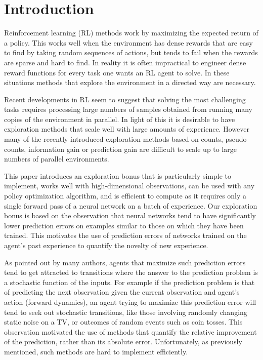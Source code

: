 \documentclass{article} %
\begin{document}
\section{Introduction}
Reinforcement learning (RL) methods work by maximizing the expected return of a policy. This works well when the environment has dense rewards that are easy to find by taking random sequences of actions, but tends to fail when the rewards are sparse and hard to find. In reality it is often impractical to engineer dense reward functions for every task one wants an RL agent to solve. In these situations methods that explore the environment in a directed way are necessary.

Recent developments in RL seem to suggest that solving the most challenging tasks \citep{SilverHuangEtAl16nature,zoph2016neural,horgan2018distributed,espeholt2018impala,openai2018dota,openai2018dexterous} requires processing large numbers of samples obtained from running many copies of the environment in parallel. In light of this it is desirable to have exploration methods that scale well with large amounts of experience. However many of the recently introduced exploration methods based on counts, pseudo-counts, information gain or prediction gain are difficult to scale up to large numbers of parallel environments.

This paper introduces an exploration bonus that is particularly simple to implement, works well with high-dimensional observations, can be used with any policy optimization algorithm, and is efficient to compute as it requires only a single forward pass of a neural network on a batch of experience. Our exploration bonus is based on the observation that neural networks tend to have significantly lower prediction errors on examples similar to those on which they have been trained. This motivates the use of prediction errors of networks trained on the agent's past experience to quantify the novelty of new experience.

As pointed out by many authors, agents that maximize such prediction errors tend to get attracted to transitions where the answer to the prediction problem is a stochastic function of the inputs. For example if the prediction problem is that of predicting the next observation given the current observation and agent's action (forward dynamics), an agent trying to maximize this prediction error will tend to seek out stochastic transitions, like those involving randomly changing static noise on a TV, or outcomes of random events such as coin tosses. This observation motivated the use of methods that quantify the relative improvement of the prediction, rather than its absolute error. Unfortunately, as previously mentioned, such methods are hard to implement efficiently.
\end{document}
